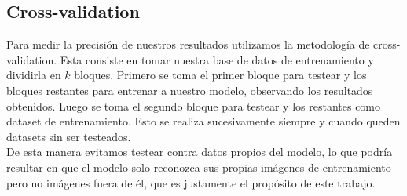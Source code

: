 \subsection{Cross-validation}
Para medir la precisión de nuestros resultados utilizamos la metodología de cross-validation. Esta consiste en tomar nuestra base de datos de entrenamiento y dividirla en $k$ bloques. Primero se toma el primer bloque para testear y los bloques restantes para entrenar a nuestro modelo, observando los resultados obtenidos. Luego se toma el segundo bloque para testear y los restantes como dataset de entrenamiento. Esto se realiza sucesivamente siempre y cuando queden datasets sin ser testeados.
\\
De esta manera evitamos testear contra datos propios del modelo, lo que podría resultar en que el modelo solo reconozca sus propias imágenes de entrenamiento pero no imágenes fuera de él, que es justamente el propósito de este trabajo.
